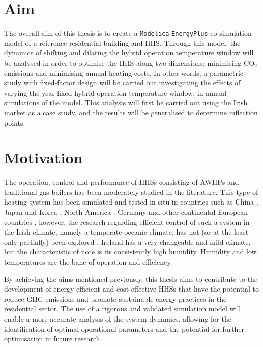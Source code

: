 \section{Aim}
The overall aim of this thesis is to create a \texttt{Modelica}-\texttt{EnergyPlus} co-simulation model of a reference residential building and \ac{HHS}. Through this model, the dynamics of shifting and dilating the hybrid operation temperature window will be analysed in order to optimise the \ac{HHS} along two dimensions: minimising $\text{CO}_2$ emissions and minimising annual heating costs. In other words, a parametric study with fixed-factor design will be carried out investigating the effects of varying the year-fixed hybrid operation temperature window, in annual simulations of the model. This analysis will first be carried out using the Irish market as a case study, and the results will be generalised to determine inflection points.

\section{Motivation}
The operation, control and performance of \acp{HHS} consisting of \acp{AWHP} and traditional gas boilers has been moderately studied in the literature. This type of heating system has been simulated and tested in-situ in countries such as China \cite{li_parallel_2018}, Japan and Korea \cite{jang_continuous_2013, park_performance_2014}, North America \cite{rauschkolb_cost-optimal_2020, }, Germany \cite{klein_numerical_2014} and other continental European countries \cite{bagarella_annual_2016, roccatello_analysis_2022, amirkhizi_cost_2020, dongellini_influence_2021,di_perna_experimental_2015}, however, the research regarding efficient control of such a system in the Irish climate, namely a temperate oceanic climate, has not (or at the least only partially) been explored \cite{heinen_electricity_2016}. Ireland has a very changeable and mild climate, but the characteristic of note is its consistently high humidity. Humidity and low temperatures are the bane of \HP operation and efficiency.

By achieving the aims mentioned previously, this thesis aims to contribute to the development of energy-efficient and cost-effective \acp{HHS} that have the potential to reduce \ac{GHG} emissions and promote sustainable energy practices in the residential sector. The use of a rigorous and validated simulation model will enable a more accurate analysis of the system dynamics, allowing for the identification of optimal operational parameters and the potential for further optimisation in future research.

